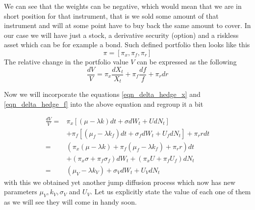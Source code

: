 \documentclass[times, utf8, diplomski]{fer}
\begin{document}
We can see that the weights can be negative, which would mean that we are in short position for that instrument, that is we sold some amount of that instrument and will at some point have to buy back the same amount to cover. In our case we will have just a stock, a derivative security (option) and a riskless asset which can be for example a bond. Such defined portfolio then looks like this 
$$ \pi = [\pi_x, \pi_f, \pi_r] $$
The relative change in the portfolio value $V$ can be expressed as the following
\begin{equation}\label{eqn_delta_hedge_v}
	\frac{dV}{V} = \pi_x\frac{dX_t}{X_t} + \pi_f\frac{df}{f} + \pi_r dr
\end{equation}

Now we will incorporate the equations \ref{eqn_delta_hedge_x} and \ref{eqn_delta_hedge_f} into the above equation and regroup it a bit

\begin{align*}
	\frac{dV}{V} =& \pi_x [(\mu - \lambda k)dt + \sigma dW_t + UdN_t] \\&+\pi_f [(\mu_f - \lambda k_f)dt + \sigma_f dW_t + U_fdN_t] +\pi_r r dt \\
				 =& (\pi_x(\mu-\lambda k) + \pi_f (\mu_f - \lambda k_f) + \pi_r r) dt \\&+ (\pi_x\sigma + \pi_f\sigma_f)dW_t + (\pi_x U + \pi_f U_f)dN_t \\
				 =& (\mu_V - \lambda k_V) + \sigma_V dW_t + U_V dN_t
\end{align*} with this we obtained yet another jump diffusion process which now has new parameters $\mu_V, k_V, \sigma_V$ and $U_V$. Let us explicitly state the value of each one of them as we will see they will come in handy soon.
\end{document}
